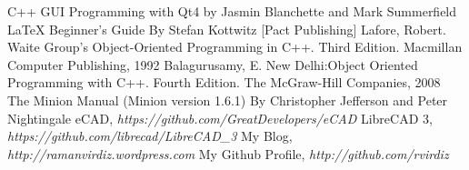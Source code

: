 \begin{thebibliography}{9}
\bibitem{} C++ GUI Programming with Qt4 by Jasmin Blanchette and Mark Summerfield
\bibitem{} \LaTeX{} Beginner's Guide By Stefan Kottwitz [Pact Publishing]
\bibitem{} Lafore, Robert. Waite Group’s Object-Oriented Programming in C++. Third Edition. Macmillan Computer Publishing, 1992
\bibitem{} Balagurusamy, E. New Delhi:Object Oriented Programming with C++. Fourth Edition. The McGraw-Hill Companies, 2008
\bibitem{} The Minion Manual (Minion version 1.6.1) By Christopher Jefferson and Peter Nightingale
\bibitem{} eCAD, \emph{https://github.com/GreatDevelopers/eCAD}
\bibitem{} LibreCAD 3, \emph{https://github.com/librecad/LibreCAD\_3}
\bibitem{} My Blog, \emph{http://ramanvirdiz.wordpress.com}
\bibitem{} My Github Profile, \emph{http://github.com/rvirdiz}
\end{thebibliography}
